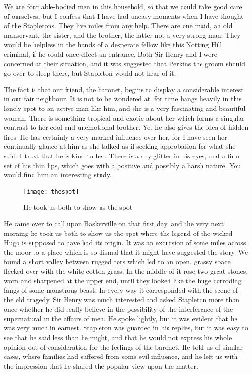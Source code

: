 \documentclass[paper=a5,BCOR=7mm,twoside,DIV=calc,12pt,usegeometry,openany,chapterprefix,endperiod,headings=big]{scrbook} %
\begin{document}
We are four able-bodied men in this household, so that we could take good care of ourselves, but I confess that I have had uneasy moments when I have thought of the Stapletons. They live miles from any help. There are one maid, an old manservant, the sister, and the brother, the latter not a very strong man. They would be helpless in the hands of a desperate fellow like this Notting Hill criminal, if he could once effect an entrance. Both Sir Henry and I were concerned at their situation, and it was suggested that Perkins the groom should go over to sleep there, but Stapleton would not hear of it.

The fact is that our friend, the baronet, begins to display a considerable interest in our fair neighbour. It is not to be wondered at, for time hangs heavily in this lonely spot to an active man like him, and she is a very fascinating and beautiful woman. There is something tropical and exotic about her which forms a singular contrast to her cool and unemotional brother. Yet he also gives the idea of hidden fires. He has certainly a very marked influence over her, for I have seen her continually glance at him as she talked as if seeking approbation for what she said. I trust that he is kind to her. There is a dry glitter in his eyes, and a firm set of his thin lips, which goes with a positive and possibly a harsh nature. You would find him an interesting study.

\begin{figure}[ph]
\centering
\texttt{[image: thespot]}
\caption{He took us both to show us the spot}
\end{figure}

He came over to call upon Baskerville on that first day, and the very next morning he took us both to show us the spot where the legend of the wicked Hugo is supposed to have had its origin. It was an excursion of some miles across the moor to a place which is so dismal that it might have suggested the story. We found a short valley between rugged tors which led to an open, grassy space flecked over with the white cotton grass. In the middle of it rose two great stones, worn and sharpened at the upper end, until they looked like the huge corroding fangs of some monstrous beast. In every way it corresponded with the scene of the old tragedy. Sir Henry was much interested and asked Stapleton more than once whether he did really believe in the possibility of the interference of the supernatural in the affairs of men. He spoke lightly, but it was evident that he was very much in earnest. Stapleton was guarded in his replies, but it was easy to see that he said less than he might, and that he would not express his whole opinion out of consideration for the feelings of the baronet. He told us of similar cases, where families had suffered from some evil influence, and he left us with the impression that he shared the popular view upon the matter.
\end{document}
